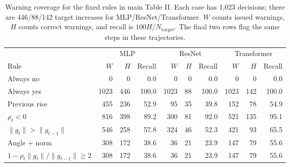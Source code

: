 \begin{table}[!ht]
\centering
\caption{Warning coverage for the fixed rules in main Table II. Each case has 1,023 decisions; there are 446/88/142 target increases for MLP/ResNet/Transformer. $W$ counts issued warnings, $H$ counts correct warnings, and recall is $100H/N_{\mathrm{target}}$. The final two rows flag the same steps in these trajectories.}
\label{tab:supp-warning-coverage}
\small
\setlength{\tabcolsep}{3pt}
\begin{tabular}{lrrr|rrr|rrr}
\hline
& \multicolumn{3}{c|}{MLP} & \multicolumn{3}{c|}{ResNet} & \multicolumn{3}{c}{Transformer} \\
Rule & $W$ & $H$ & Recall & $W$ & $H$ & Recall & $W$ & $H$ & Recall \\ \hline
Always no & 0 & 0 & 0.0 & 0 & 0 & 0.0 & 0 & 0 & 0.0 \\
Always yes & 1023 & 446 & 100.0 & 1023 & 88 & 100.0 & 1023 & 142 & 100.0 \\
Previous rise & 455 & 236 & 52.9 & 95 & 35 & 39.8 & 152 & 78 & 54.9 \\
$\rho_t<0$ & 816 & 398 & 89.2 & 300 & 81 & 92.0 & 521 & 135 & 95.1 \\
$\|g_t\|>\|g_{t-1}\|$ & 546 & 258 & 57.8 & 324 & 46 & 52.3 & 421 & 93 & 65.5 \\
Angle + norm & 308 & 172 & 38.6 & 36 & 21 & 23.9 & 147 & 79 & 55.6 \\
$1-\rho_t\|g_t\|/\|g_{t-1}\|\geq2$ & 308 & 172 & 38.6 & 36 & 21 & 23.9 & 147 & 79 & 55.6 \\
\hline
\end{tabular}
\end{table}
